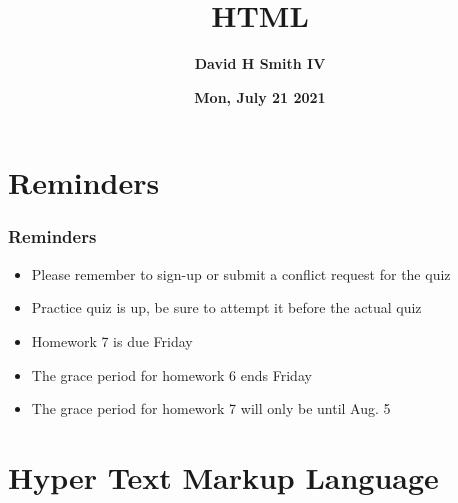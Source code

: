 \documentclass{beamer}
\title{\textbf{HTML}}
\author{\textbf{David H Smith IV}}
\institute[\textbf{UIUC}]{\textbf{University of Illinois Urbana-Champaign}}
\date{\textbf{Mon, July 21 2021}}
\begin{document}
\frame{\titlepage}

\section{Reminders}

%
%
\begin{frame}
  \frametitle{Reminders}
  \begin{itemize}
    \item Please remember to sign-up or submit a conflict request for the quiz
    \item Practice quiz is up, be sure to attempt it before the actual quiz
    \item Homework 7 is due Friday 
    \item The grace period for homework 6 ends Friday
    \item The grace period for homework 7 will only be until Aug. 5
  \end{itemize}
\end{frame}

\section{Hyper Text Markup Language}
\end{document}
